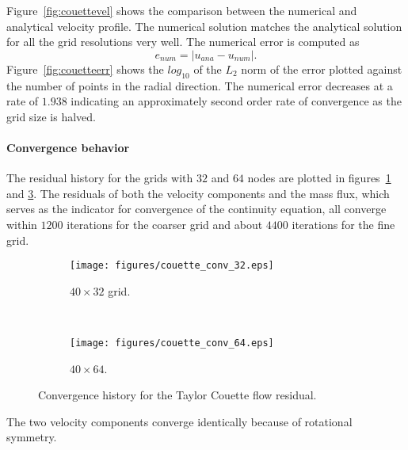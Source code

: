Figure~\ref{fig:couettevel} shows the comparison between the numerical and analytical velocity profile. The numerical solution matches the analytical solution for all the grid resolutions very well. The numerical error is computed as 
\begin{equation*}
e_{num} = |u_{ana} - u_{num}|.
\end{equation*} 
Figure~\ref{fig:couetteerr} shows the $log_{10}$ of the $L_2$ norm of the error plotted against the number of points in the radial direction.  The numerical error decreases at a rate of $1.938$ indicating an approximately second order rate of convergence as the grid size is halved.

\paragraph{Convergence behavior}
The residual history for the grids with $32$ and $64$ nodes are plotted in figures~\ref{fig:couetteres32} and \ref{fig:couetteres64}. The residuals of both the velocity components and the mass flux, which serves as the indicator for convergence of the continuity equation, all converge within $1200$ iterations for the coarser grid and about $4400$ iterations for the fine grid.
\begin{figure}[h]
    \centering
     \captionsetup{justification=centering}
    \begin{subfigure}[b]{0.48\textwidth}
    \captionsetup{justification=centering}
        \texttt{[image: figures/couette\_conv\_32.eps]}
        \caption{$40\times32$ grid.}
        \label{fig:couetteres32}
    \end{subfigure}
    ~ %
    \begin{subfigure}[b]{0.48\textwidth}
    \centering
    \captionsetup{justification=centering}
        \texttt{[image: figures/couette\_conv\_64.eps]}
        \caption{$40\times64$.}
        \label{fig:couetteres64}
    \end{subfigure}
    \caption{Convergence history for the Taylor Couette flow residual.}
\end{figure}
The two velocity components converge identically because of rotational symmetry.

